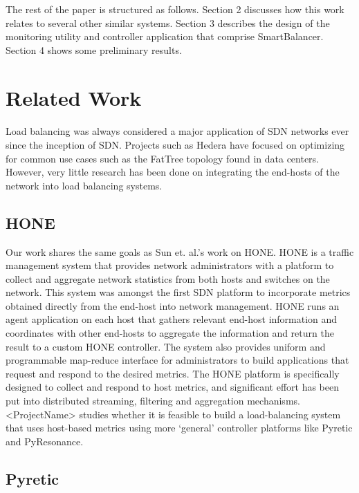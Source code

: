 \documentclass[10pt]{article}
\begin{document}
The rest of the paper is structured as follows. Section 2 discusses how this work relates to several other similar systems. Section 3 describes the design of the monitoring utility and controller application that comprise SmartBalancer. Section 4 shows some preliminary results.

\section{Related Work}
\label{sec:related}

\paragraph{} Load balancing was always considered a major application of SDN networks ever since the inception of SDN. Projects such as Hedera \cite{Hedera} have focused on optimizing for common use cases such as the FatTree topology found in data centers. However, very little research has been done on integrating the end-hosts of the network into load balancing systems.



\subsection{HONE}


Our work shares the same goals as Sun et. al.’s work on HONE. HONE is a traffic management system that provides network administrators with a platform to collect and aggregate network statistics from both hosts and switches on the network. This system was amongst the first SDN platform to incorporate metrics obtained directly from the end-host into network management. HONE\cite{HONE} runs an agent application on each host that gathers relevant end-host information and coordinates with other end-hosts to aggregate the information and return the result to a custom HONE controller. The system also provides uniform and programmable map-reduce interface for administrators to build applications that request and respond to the desired metrics. The HONE platform is specifically designed to collect and respond to host metrics, and significant effort has been put into distributed streaming, filtering and aggregation mechanisms. <ProjectName> studies whether it is feasible to build a load-balancing system that uses host-based metrics using more ‘general’ controller platforms like Pyretic\cite{Pyretic} and PyResonance\cite{PyResonance}. 

\subsection{Pyretic}
\end{document}
